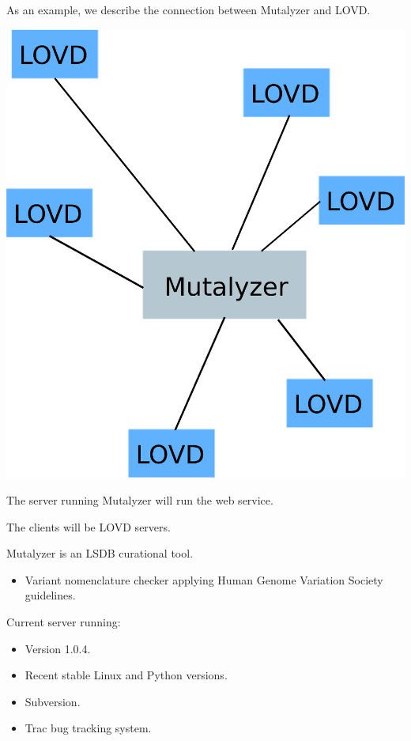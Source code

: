 \documentclass[a4, portrait]{seminar}
\begin{document}
\begin{slide}
As an example, we describe the connection between Mutalyzer and LOVD.

\begin{center}
\includegraphics[scale = 0.25]{mapper}
\end{center}

The server running Mutalyzer will run the web service.

The clients will be LOVD servers.
\vfill
\end{slide}


\begin{slide}
Mutalyzer is an LSDB curational tool.
\begin{itemize}
\item Variant nomenclature checker applying Human Genome Variation Society guidelines.
\end{itemize}

\vspace*{1cm}
Current server running:
\begin{itemize}
\item Version 1.0.4.
\item Recent stable Linux and Python versions.
\item Subversion.
\item Trac bug tracking system.
\end{itemize}
\vfill
\end{slide}
\end{document}
